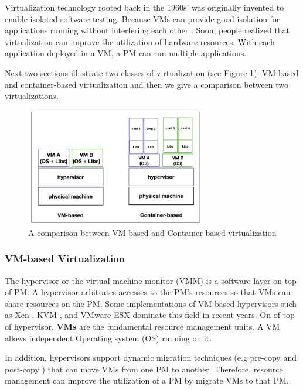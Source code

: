 Virtualization technology rooted back in the 1960s' was originally invented to enable isolated software testing. Because VMs can provide good isolation for applications running without interfering each other \cite{Somani:2009ho}. Soon, people realized that virtualization can improve the utilization of hardware resources: With each application deployed in a VM, a PM can run multiple applications. 

Next two sections illustrate two classes of virtualization (see Figure \ref{fig:comparison}): VM-based and container-based virtualization and then we give a comparison between two virtualizations.

\begin{figure}
	\centering
	\includegraphics[width=0.7\textwidth]{pics/comparison.png}
	\caption{A comparison between VM-based and Container-based virtualization \cite{Piraghaj:2016bw}}
	\label{fig:comparison}
\end{figure}

\subsubsection{VM-based Virtualization} 

The hypervisor or the virtual machine monitor (VMM) is a software layer on top of PM. A hypervisor arbitrates accesses to the PM's resources so that VMs can share resources on the PM. Some implementations of VM-based hypervisors such as Xen \cite{Barham:2003cj}, KVM \cite{Kivity:2007wu}, and VMware ESX \cite{Waldspurger:2002db} dominate this field in recent years. On of top of hypervisor, \textbf{VMs} are the fundamental resource management units. A VM allows independent Operating system (OS) running on it.  

In addition, hypervisors support dynamic migration techniques (e.g pre-copy \cite{Clark:2005ud} and post-copy \cite{Hines:2009fv}) that can move VMs from one PM to another. Therefore, resource management can improve the utilization of a PM by migrate VMs to that PM.

